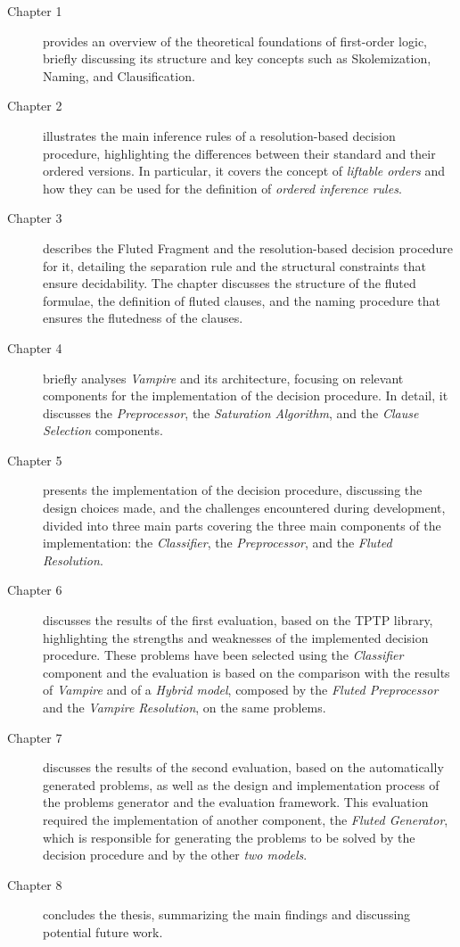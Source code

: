 \begin{description}
    \item[Chapter 1] provides an overview of the theoretical foundations of first-order logic, briefly discussing its structure and key concepts such as Skolemization, Naming, and Clausification.
    \item[Chapter 2] illustrates the main inference rules of a resolution-based decision procedure, highlighting the differences between their standard and their ordered versions. In particular, it covers the concept of \textit{liftable orders} and how they can be used for the definition of \textit{ordered inference rules}.
    \item[Chapter 3] describes the Fluted Fragment and the resolution-based decision procedure for it, detailing the separation rule and the structural constraints that ensure decidability. The chapter discusses the structure of the fluted formulae, the definition of fluted clauses, and the naming procedure that ensures the flutedness of the clauses.
    \item[Chapter 4] briefly analyses \textit{Vampire} and its architecture, focusing on relevant components for the implementation of the decision procedure. In detail, it discusses the \textit{Preprocessor}, the \textit{Saturation Algorithm}, and the \textit{Clause Selection} components.
    \item[Chapter 5] presents the implementation of the decision procedure, discussing the design choices made, and the challenges encountered during development, divided into three main parts covering the three main components of the implementation: the \textit{Classifier}, the \textit{Preprocessor}, and the \textit{Fluted Resolution}.
    \item[Chapter 6] discusses the results of the first evaluation, based on the TPTP library, highlighting the strengths and weaknesses of the implemented decision procedure. These problems have been selected using the \textit{Classifier} component and the evaluation is based on the comparison with the results of \textit{Vampire} and of a \textit{Hybrid model}, composed by the \textit{Fluted Preprocessor} and the \textit{Vampire Resolution}, on the same problems.
    \item[Chapter 7] discusses the results of the second evaluation, based on the automatically generated problems, as well as the design and implementation process of the problems generator and the evaluation framework. This evaluation required the implementation of another component, the \textit{Fluted Generator}, which is responsible for generating the problems to be solved by the decision procedure and by the other \textit{two models}.
    \item[Chapter 8] concludes the thesis, summarizing the main findings and discussing potential future work.
\end{description}



